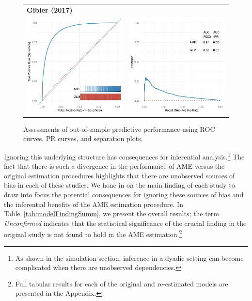 \begin{figure}
\begin{tabular}{cc}
		\multicolumn{2}{l}{\textbf{\tiny{Gibler (2017)}}} \\
		\includegraphics[width=.4\textwidth]{graphics/gibler_roc_outSample.pdf} & 
		\includegraphics[width=.4\textwidth]{graphics/gibler_pr_outSample.pdf} \\
	\end{tabular}
	\caption{Assessments of out-of-sample predictive performance using ROC curves, PR curves, and separation plots.}
	\label{fig:perf}	
\end{figure}

Ignoring this underlying structure has consequences for inferential analysis.\footnote{As shown in the simulation section, inference in a dyadic setting can become complicated when there are unobserved dependencies.} The fact that there is such a divergence in the performance of AME versus the original estimation procedures highlights that there are unobserved sources of bias in each of these studies. We hone in on the main finding of each study to draw into focus the potential consequences for ignoring these sources of bias and the inferential benefits of the AME estimation procedure.  In Table~\ref{tab:modelFindingSumm}, we present the overall results; the term \textit{Unconfirmed} indicates that the statistical significance of the crucial finding in the original study is not found to hold in the AME estimation.\footnote{Full tabular results for each of the original and re-estimated models are presented in the Appendix.}

